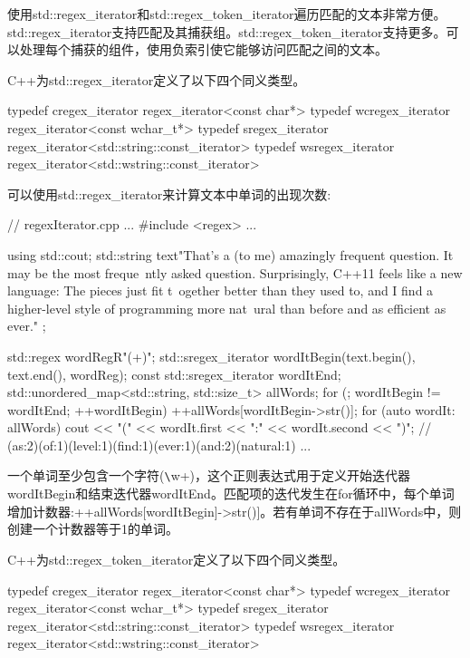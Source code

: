 

使用std::regex\_iterator和std::regex\_token\_iterator遍历匹配的文本非常方便。std::regex\_iterator支持匹配及其捕获组。std::regex\_token\_iterator支持更多。可以处理每个捕获的组件，使用负索引使它能够访问匹配之间的文本。


C++为std::regex\_iterator定义了以下四个同义类型。

\begin{cpp}
typedef cregex_iterator regex_iterator<const char*>
typedef wcregex_iterator regex_iterator<const wchar_t*>
typedef sregex_iterator regex_iterator<std::string::const_iterator>
typedef wsregex_iterator regex_iterator<std::wstring::const_iterator>
\end{cpp}

可以使用std::regex\_iterator来计算文本中单词的出现次数:


\begin{cpp}
// regexIterator.cpp
...
#include <regex>
...

using std::cout;
std::string text{"That's a (to me) amazingly frequent question. It may be the most freque\
ntly asked question. Surprisingly, C++11 feels like a new language: The pieces just fit t\
ogether better than they used to, and I find a higher-level style of programming more nat\
ural than before and as efficient as ever." };

std::regex wordReg{R"(\w+)"};
std::sregex_iterator wordItBegin(text.begin(), text.end(), wordReg);
const std::sregex_iterator wordItEnd;
std::unordered_map<std::string, std::size_t> allWords;
for (; wordItBegin != wordItEnd; ++wordItBegin){
	++allWords[wordItBegin->str()];
}
for (auto wordIt: allWords) cout << "(" << wordIt.first << ":"
								        << wordIt.second << ")";
					// (as:2)(of:1)(level:1)(find:1)(ever:1)(and:2)(natural:1) ...
\end{cpp}

一个单词至少包含一个字符(\verb|\|w+)，这个正则表达式用于定义开始迭代器wordItBegin和结束迭代器wordItEnd。匹配项的迭代发生在for循环中，每个单词增加计数器:++allWords[wordItBegin]->str()]。若有单词不存在于allWords中，则创建一个计数器等于1的单词。


C++为std::regex\_token\_iterator定义了以下四个同义类型。

\begin{cpp}
typedef cregex_iterator regex_iterator<const char*>
typedef wcregex_iterator regex_iterator<const wchar_t*>
typedef sregex_iterator regex_iterator<std::string::const_iterator>
typedef wsregex_iterator regex_iterator<std::wstring::const_iterator>
\end{cpp}

